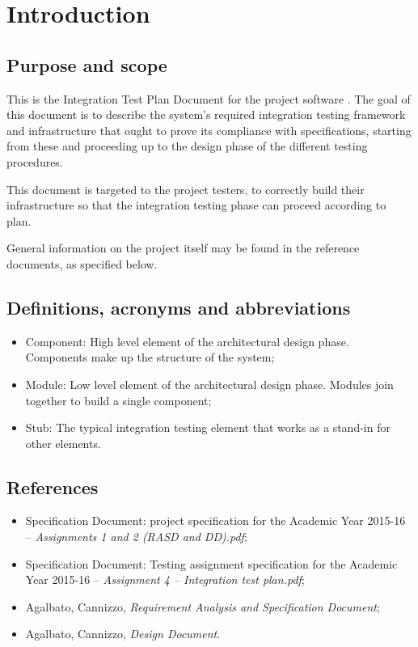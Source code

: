 \chapter{Introduction}

\section{Purpose and scope}
This is the Integration Test Plan Document for the project software \mts{}. The goal of this document is to describe the system's required integration testing framework and infrastructure that ought to prove its compliance with specifications, starting from these and proceeding up to the design phase of the different testing procedures.

This document is targeted to the project testers, to correctly build their infrastructure so that the integration testing phase can proceed according to plan.

General information on the \mts{} project itself may be found in the reference documents, as specified below.

\section{Definitions, acronyms and abbreviations}
\begin{itemize}
\item Component: High level element of the architectural design phase. Components make up the structure of the system;
\item Module: Low level element of the architectural design phase. Modules join together to build a single component;
\item Stub: The typical integration testing element that works as a stand-in for other elements.
\end{itemize}

\section{References}
\begin{itemize}
\item Specification Document: \mts{} project specification for the Academic Year 2015-16 -- \emph{Assignments 1 and 2 (RASD and DD).pdf};
\item Specification Document: Testing assignment specification for the Academic Year 2015-16 -- \emph{Assignment 4 -- Integration test plan.pdf};
\item Agalbato, Cannizzo, \emph{Requirement Analysis and Specification Document};
\item Agalbato, Cannizzo, \emph{Design Document}.
\end{itemize}
